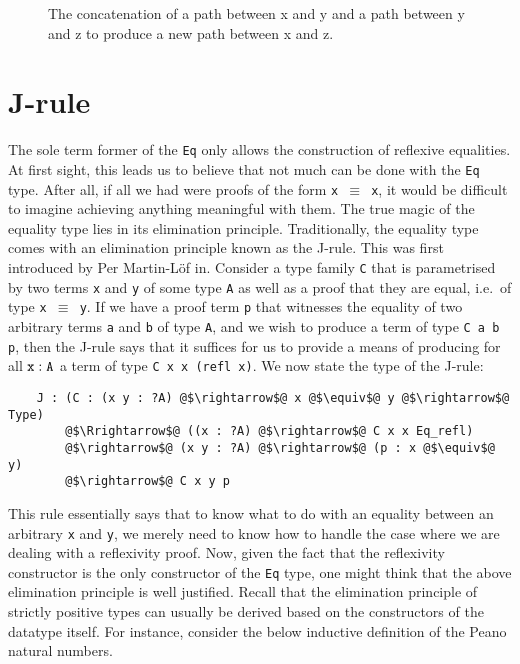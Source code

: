 \documentclass[12pt,twoside,maitrise]{dms}
\theoremstyle{definition}
\numberwithin{equation}{section}
\numberwithin{table}{chapter}
\numberwithin{figure}{chapter}
\newcommand\id[1] {\texttt{#1}}
\newcommand\fn[1] {\texttt{#1}}
\begin{document}
\begin{figure}

\caption{The concatenation of a path between x and y and a path between y and z to produce a new path between x and z.}\label{fig:eq-trans}
\end{figure}


\section{J-rule}\label{subsec:j-rule}
The sole term former of the \id{Eq} only allows the construction of reflexive
equalities. At first sight, this leads us to believe that not much can be done
with the \id{Eq} type. After all, if all we had were proofs of the form \fn{x
  $\equiv$ x}, it would be difficult to imagine achieving anything meaningful
with them. The true magic of the equality type lies in its elimination
principle. Traditionally, the equality type comes with an elimination principle
known as the J-rule. This was first introduced by Per Martin-Löf
in\cite{martin1975intuitionistic}. Consider a type family \id{C} that is
parametrised by two terms \id{x} and \id{y} of some type \id{A} as well as a
proof that they are equal, i.e.\ of type \fn{x $\equiv$ y}. If we have a proof
term \id{p} that witnesses the equality of two arbitrary terms \id{a} and \id{b}
of type \id{A}, and we wish to produce a term of type \fn{C a b p}, then the
J-rule says that it suffices for us to provide a means of producing for all
$\oftype{\id{x}}{\id{A}}$ a term of type \fn{C x x (refl x)}. We now state the
type of the J-rule:

\begin{verbatim}
    J : (C : (x y : ?A) @$\rightarrow$@ x @$\equiv$@ y @$\rightarrow$@ Type)
        @$\Rrightarrow$@ ((x : ?A) @$\rightarrow$@ C x x Eq_refl)
        @$\rightarrow$@ (x y : ?A) @$\rightarrow$@ (p : x @$\equiv$@ y)
        @$\rightarrow$@ C x y p
\end{verbatim}

This rule essentially says that to know what to do with an equality between an
arbitrary \id{x} and \id{y}, we merely need to know how to handle the case where
we are dealing with a reflexivity proof. Now, given the fact that the
reflexivity constructor is the only constructor of the \id{Eq} type, one might
think that the above elimination principle is well justified. Recall that the
elimination principle of strictly positive types\cite{abbott2005containers} can
usually be derived based on the constructors of the datatype itself. For
instance, consider the below inductive definition of the Peano natural numbers.
\end{document}
